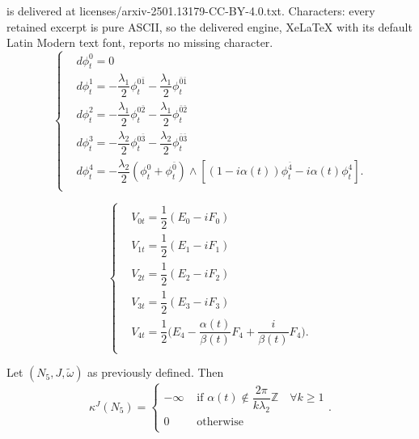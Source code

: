 \documentclass[10pt,a4paper]{amsart}
\begin{document}
is delivered at licenses/arxiv-2501.13179-CC-BY-4.0.txt. Characters: every retained excerpt is pure ASCII, so the delivered engine, XeLaTeX with its default Latin Modern text font, reports no missing character.
\begin{equation}\label{EqStrutturaKodairaGenNakamura}
\left\{
	\begin{split}
    	& d\phi_{t}^{0} = 0 \\
		& d\phi_{t}^{1} = -\dfrac{\lambda_{1}}{2}\phi_{t}^{0\bar 1} -\dfrac{\lambda_{1}}{2}\phi_{t}^{\bar 0 \bar 1} \\
		&d\phi_{t}^{2} = -\dfrac{\lambda_{1}}{2}\phi_{t}^{0\bar 2} -\dfrac{\lambda_{1}}{2}\phi_{t}^{\bar 0 \bar2} \\
		&d\phi_{t}^{3} = -\dfrac{\lambda_{2}}{2}\phi_{t}^{0\bar 3} -\dfrac{\lambda_{2}}{2}\phi_{t}^{\bar 0 \bar3} \\
		&d\phi_{t}^{4} = -\dfrac{\lambda_{2}}{2}(\phi_{t}^{0} + \phi_{t}^{\bar0}) \wedge [(1-i\alpha(t))\phi_{t}^{\bar4} - i\alpha(t)\phi_{t}^{4}]. \\
	\end{split}
    \right.
\end{equation}

\begin{equation}\label{RifDualeKodairaGenNakamura}
\left\{
	\begin{split}
		&V_{0t} = \dfrac{1}{2}(E_{0} - iF_{0}) \\
		&V_{1t} = \dfrac{1}{2}(E_{1} - iF_{1}) \\
		&V_{2t} = \dfrac{1}{2}(E_{2} - iF_{2}) \\
		&V_{3t} = \dfrac{1}{2}(E_{3} - iF_{3}) \\
		&V_{4t} = \dfrac{1}{2}\bigg(E_{4} - \dfrac{\alpha(t)}{\beta(t)}F_{4} + \dfrac{i}{\beta(t)}F_{4}\bigg). \\
	\end{split}
    \right.
\end{equation}

\begin{proposizione}
	Let $ (N_{5}, J, \tilde{\omega}) $ as previously defined. Then  
	\[ \kappa^{J}(N_{5}) = \begin{cases}
		-\infty & \text{ if } \alpha(t) \notin \dfrac{2\pi}{k\lambda_{2}}\mathbb{Z} \quad \forall k \ge 1 \\
		0 & \text{ otherwise } \\
	\end{cases}. \] 
\end{proposizione}
\end{document}

